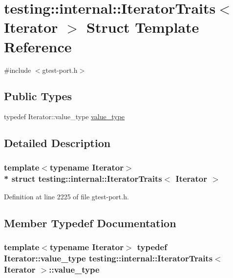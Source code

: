 \hypertarget{structtesting_1_1internal_1_1_iterator_traits}{}\section{testing\+:\+:internal\+:\+:Iterator\+Traits$<$ Iterator $>$ Struct Template Reference}
\label{structtesting_1_1internal_1_1_iterator_traits}


{\ttfamily \#include $<$gtest-\/port.\+h$>$}

\subsection*{Public Types}
\begin{DoxyCompactItemize}
\item 
typedef Iterator\+::value\+\_\+type \hyperlink{structtesting_1_1internal_1_1_iterator_traits_a29de4320a9c53ce438d3561b94e515bb}{value\+\_\+type}
\end{DoxyCompactItemize}


\subsection{Detailed Description}
\subsubsection*{template$<$typename Iterator$>$\\*
struct testing\+::internal\+::\+Iterator\+Traits$<$ Iterator $>$}



Definition at line 2225 of file gtest-\/port.\+h.



\subsection{Member Typedef Documentation}
\subsubsection[{\texorpdfstring{value\+\_\+type}{value_type}}]{\setlength{\rightskip}{0pt plus 5cm}template$<$typename Iterator$>$ typedef Iterator\+::value\+\_\+type {\bf testing\+::internal\+::\+Iterator\+Traits}$<$ Iterator $>$\+::{\bf value\+\_\+type}}\hypertarget{structtesting_1_1internal_1_1_iterator_traits_a29de4320a9c53ce438d3561b94e515bb}{}\label{structtesting_1_1internal_1_1_iterator_traits_a29de4320a9c53ce438d3561b94e515bb}


